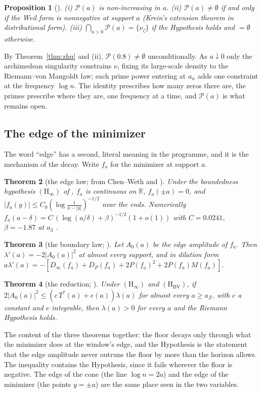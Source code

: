 \documentclass[11pt]{article}
\newtheorem{theorem}{Theorem}[section]
\newtheorem{proposition}[theorem]{Proposition}
\theoremstyle{definition}
\theoremstyle{remark}
\newcommand{\R}{\mathbb R}
\newcommand{\Tst}{T^{*}}
\newcommand{\PS}{\mathcal P}
\begin{document}
\begin{proposition}[{\cite[Props.\ 2.2--2.3]{potential}}]\label{prop:potential}
(i) $\PS(a)$ is non-increasing in $a$. (ii) $\PS(a)\ne\emptyset$ if and only if the Weil form is nonnegative at support $a$ (Krein's extension theorem in distributional form). (iii) $\bigcap_{a>0}\PS(a)=\{\nu_\zeta\}$ if the Hypothesis holds and $=\emptyset$ otherwise.
\end{proposition}
By Theorem~\ref{thm:zhu} and (ii), $\PS(0.8)\ne\emptyset$ unconditionally. As $a\downarrow0$ only the archimedean singularity constrains $\nu$, fixing its large-scale density to the Riemann--von Mangoldt law; each prime power entering at $a_n$ adds one constraint at the frequency $\log n$. The identity prescribes how many zeros there are, the primes prescribe where they are, one frequency at a time, and $\PS(a)$ is what remains open.

\subsection{The edge of the minimizer}
The word ``edge'' has a second, literal meaning in the programme, and it is the mechanism of the decay. Write $f_a$ for the minimizer at support $a$.
\begin{theorem}[the edge law; {\cite[Thm.\ 3.2]{window}} from Chen--Weth \cite{chenweth} and \cite{hls}]\label{thm:edgelaw}
Under the boundedness hypothesis $(\mathrm H_\infty)$ of \cite{window}, $f_a$ is continuous on $\R$, $f_a(\pm a)=0$, and $|f_a(y)|\le C_0(\log\frac1{a-|y|})^{-1/2}$ near the ends. Numerically $f_a(a-\delta)=C\,(\log(a/\delta)+\beta)^{-1/2}(1+o(1))$ with $C=0.0241$, $\beta=-1.87$ at $a_3$ \cite[Computation 3.4]{window}.
\end{theorem}
\begin{theorem}[the boundary law; {\cite[Thm.\ 9.12 and the every-support theorem of \S9]{window}}]\label{thm:boundary}
Let $A_0(a)$ be the edge amplitude of $f_a$. Then $\lambda'(a)=-2|A_0(a)|^2$ at almost every support, and in dilation form $a\lambda'(a)=-[D_\infty(f_a)+D_P(f_a)+2P(f_a)^2+2P(f_a)M(f_a)]$.
\end{theorem}
\begin{theorem}[the reduction; {\cite[Main theorem]{window}}]\label{thm:reduction}
Under $(\mathrm H_\infty)$ and $(\mathrm H_{\mathrm{BV}})$, if $2|A_0(a)|^2\le(c\,\Tst(a)+e(a))\lambda(a)$ for almost every $a\ge a_Z$, with $c$ a constant and $e$ integrable, then $\lambda(a)>0$ for every $a$ and the Riemann Hypothesis holds.
\end{theorem}
The content of the three theorems together: the floor decays only through what the minimizer does at the window's edge, and the Hypothesis is the statement that the edge amplitude never outruns the floor by more than the horizon allows. The inequality contains the Hypothesis, since it fails wherever the floor is negative. The edge of the cone (the line $\log n=2a$) and the edge of the minimizer (the points $y=\pm a$) are the same place seen in the two variables.
\end{document}
